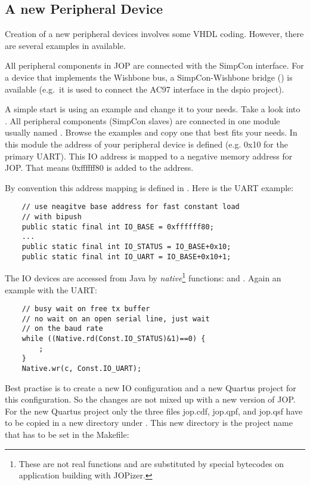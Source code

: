 \subsection{A new Peripheral Device}


Creation of a new peripheral devices involves some VHDL coding.
However, there are several examples in 
available.


All peripheral components in JOP are connected with the SimpCon
\cite{simpcon} interface. For a device that implements the Wishbone
\cite{soc:wishbone} bus, a SimpCon-Wishbone bridge
() is available (e.g.\ it is used to connect the
AC97 interface in the dspio project).

A simple start is using an example and change it to your needs. Take
a look into . All peripheral components
(SimpCon slaves) are connected in one module usually named
. Browse the examples and copy one that best
fits your needs. In this module the address of your peripheral
device is defined (e.g. 0x10 for the primary UART). This IO address
is mapped to a negative memory address for JOP. That means
0xffffff80 is added to the address.

By convention this address mapping is defined in
. Here is the UART example:

\begin{verbatim}
    // use neagitve base address for fast constant load
    // with bipush
    public static final int IO_BASE = 0xffffff80;
    ...
    public static final int IO_STATUS = IO_BASE+0x10;
    public static final int IO_UART = IO_BASE+0x10+1;
\end{verbatim}

The IO devices are accessed from Java by
\emph{native}\footnote{These are not real functions and are
substituted by special bytecodes on application building with
JOPizer.} functions:  and
. Again an example with the UART:

\begin{verbatim}
    // busy wait on free tx buffer
    // no wait on an open serial line, just wait
    // on the baud rate
    while ((Native.rd(Const.IO_STATUS)&1)==0) {
        ;
    }
    Native.wr(c, Const.IO_UART);
\end{verbatim}

Best practise is to create a new IO configuration
 and a new Quartus project for this
configuration. So the changes are not mixed up with a new version of
JOP. For the new Quartus project only the three files jop.cdf,
jop.qpf, and jop.qsf have to be copied in a new directory under
. This new directory is the project name that has to
be set in the Makefile:

